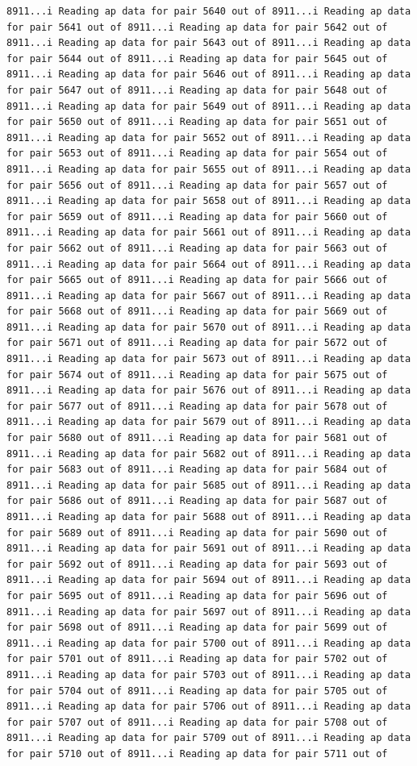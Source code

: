 \documentclass[
]{article}
\begin{document}
\begin{verbatim}
8911...i Reading ap data for pair 5640 out of 8911...i Reading ap data for pair 5641 out of 8911...i Reading ap data for pair 5642 out of 8911...i Reading ap data for pair 5643 out of 8911...i Reading ap data for pair 5644 out of 8911...i Reading ap data for pair 5645 out of 8911...i Reading ap data for pair 5646 out of 8911...i Reading ap data for pair 5647 out of 8911...i Reading ap data for pair 5648 out of 8911...i Reading ap data for pair 5649 out of 8911...i Reading ap data for pair 5650 out of 8911...i Reading ap data for pair 5651 out of 8911...i Reading ap data for pair 5652 out of 8911...i Reading ap data for pair 5653 out of 8911...i Reading ap data for pair 5654 out of 8911...i Reading ap data for pair 5655 out of 8911...i Reading ap data for pair 5656 out of 8911...i Reading ap data for pair 5657 out of 8911...i Reading ap data for pair 5658 out of 8911...i Reading ap data for pair 5659 out of 8911...i Reading ap data for pair 5660 out of 8911...i Reading ap data for pair 5661 out of 8911...i Reading ap data for pair 5662 out of 8911...i Reading ap data for pair 5663 out of 8911...i Reading ap data for pair 5664 out of 8911...i Reading ap data for pair 5665 out of 8911...i Reading ap data for pair 5666 out of 8911...i Reading ap data for pair 5667 out of 8911...i Reading ap data for pair 5668 out of 8911...i Reading ap data for pair 5669 out of 8911...i Reading ap data for pair 5670 out of 8911...i Reading ap data for pair 5671 out of 8911...i Reading ap data for pair 5672 out of 8911...i Reading ap data for pair 5673 out of 8911...i Reading ap data for pair 5674 out of 8911...i Reading ap data for pair 5675 out of 8911...i Reading ap data for pair 5676 out of 8911...i Reading ap data for pair 5677 out of 8911...i Reading ap data for pair 5678 out of 8911...i Reading ap data for pair 5679 out of 8911...i Reading ap data for pair 5680 out of 8911...i Reading ap data for pair 5681 out of 8911...i Reading ap data for pair 5682 out of 8911...i Reading ap data for pair 5683 out of 8911...i Reading ap data for pair 5684 out of 8911...i Reading ap data for pair 5685 out of 8911...i Reading ap data for pair 5686 out of 8911...i Reading ap data for pair 5687 out of 8911...i Reading ap data for pair 5688 out of 8911...i Reading ap data for pair 5689 out of 8911...i Reading ap data for pair 5690 out of 8911...i Reading ap data for pair 5691 out of 8911...i Reading ap data for pair 5692 out of 8911...i Reading ap data for pair 5693 out of 8911...i Reading ap data for pair 5694 out of 8911...i Reading ap data for pair 5695 out of 8911...i Reading ap data for pair 5696 out of 8911...i Reading ap data for pair 5697 out of 8911...i Reading ap data for pair 5698 out of 8911...i Reading ap data for pair 5699 out of 8911...i Reading ap data for pair 5700 out of 8911...i Reading ap data for pair 5701 out of 8911...i Reading ap data for pair 5702 out of 8911...i Reading ap data for pair 5703 out of 8911...i Reading ap data for pair 5704 out of 8911...i Reading ap data for pair 5705 out of 8911...i Reading ap data for pair 5706 out of 8911...i Reading ap data for pair 5707 out of 8911...i Reading ap data for pair 5708 out of 8911...i Reading ap data for pair 5709 out of 8911...i Reading ap data for pair 5710 out of 8911...i Reading ap data for pair 5711 out of 
\end{verbatim}
\end{document}
